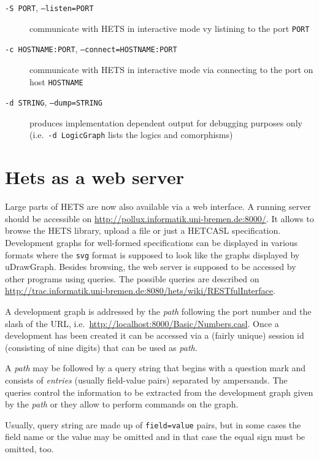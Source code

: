 \documentclass{article}
\newcommand{\normalTEXTSC}[2]{{#1\scriptsize#2}}
\newcommand     {\Hets}{\normalTEXTSC{H}{ETS}\xspace}
\newcommand{\HetCASL}{\normalTEXTSC{H}{ET}\normalTEXTSC{C}{ASL}\xspace}
\begin{document}
\begin{description}
\item[\texttt{-S PORT}, \texttt{--listen=PORT}] communicate
  with \Hets in interactive mode vy listining to the port \texttt{PORT}

\item[\texttt{-c HOSTNAME:PORT}, \texttt{--connect=HOSTNAME:PORT}] communicate
  with \Hets in interactive mode via connecting to the port on host
  \texttt{HOSTNAME}

\item[\texttt{-d STRING}, \texttt{--dump=STRING}] produces implementation
  dependent output for debugging purposes only
  (i.e.\ \texttt{-d LogicGraph} lists the logics and comorphisms)
\end{description}

\section{Hets as a web server}\label{sec:Server}

Large parts of \Hets are now also available via a web interface. A running
server should be accessible on
\url{http://pollux.informatik.uni-bremen.de:8000/}. It allows to browse the
\Hets library, upload a file or just a \HetCASL specification. Development
graphs for well-formed specifications can be displayed in various formats
where the \texttt{svg} format is supposed to look like the graphs displayed by
uDrawGraph. Besides browsing, the web server is supposed to be accessed by
other programs using queries. The possible queries are described on
\url{http://trac.informatik.uni-bremen.de:8080/hets/wiki/RESTfulInterface}.

A development graph is addressed by the \emph{path} following the port number
and the slash of the URL, i.e.\
\url{http://localhost:8000/Basic/Numbers.casl}. Once a development has been
created it can be accessed via a (fairly unique) session id (consisting of
nine digits) that can be used as \emph{path}.

A \emph{path} may be followed by a query string that begins with a question
mark and consists of \emph{entries} (usually field-value pairs) separated by
ampersands. The queries control the information to be extracted from the
development graph given by the \emph{path} or they allow to perform commands
on the graph.

Usually, query string are made up of \texttt{field=value} pairs, but in some
cases the field name or the value may be omitted and in that case the equal
sign must be omitted, too.
\end{document}
